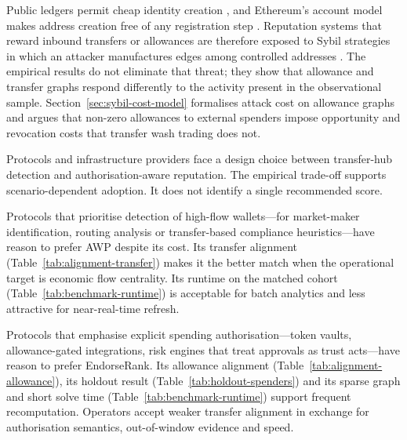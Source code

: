 
Public ledgers permit cheap identity creation , and Ethereum's account model makes address creation free of any registration step . Reputation systems that reward inbound transfers or allowances are therefore exposed to Sybil strategies in which an attacker manufactures edges among controlled addresses . The empirical results do not eliminate that threat; they show that allowance and transfer graphs respond differently to the activity present in the observational sample. Section~\ref{sec:sybil-cost-model} formalises attack cost on allowance graphs and argues that non-zero allowances to external spenders impose opportunity and revocation costs that transfer wash trading does not.


Protocols and infrastructure providers face a design choice between transfer-hub detection and authorisation-aware reputation. The empirical trade-off supports scenario-dependent adoption. It does not identify a single recommended score.


Protocols that prioritise detection of high-flow wallets---for market-maker identification, routing analysis or transfer-based compliance heuristics---have reason to prefer AWP despite its cost. Its transfer alignment (Table~\ref{tab:alignment-transfer}) makes it the better match when the operational target is economic flow centrality. Its runtime on the matched cohort (Table~\ref{tab:benchmark-runtime}) is acceptable for batch analytics and less attractive for near-real-time refresh.


Protocols that emphasise explicit spending authorisation---token vaults, allowance-gated integrations, risk engines that treat approvals as trust acts---have reason to prefer EndorseRank. Its allowance alignment (Table~\ref{tab:alignment-allowance}), its holdout result (Table~\ref{tab:holdout-spenders}) and its sparse graph and short solve time (Table~\ref{tab:benchmark-runtime}) support frequent recomputation. Operators accept weaker transfer alignment in exchange for authorisation semantics, out-of-window evidence and speed.

